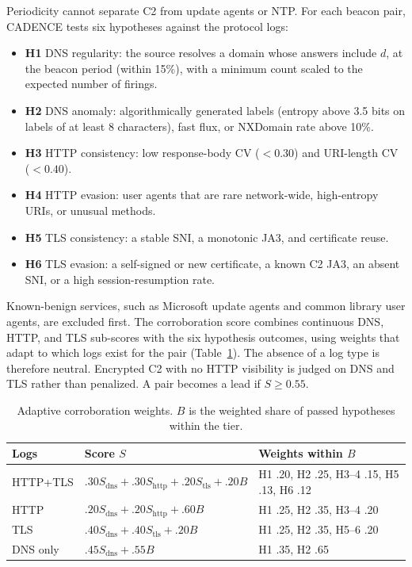 \documentclass[runningheads]{llncs}
\begin{document}
Periodicity cannot separate C2 from update agents or NTP. For each beacon pair, CADENCE tests six hypotheses against the protocol logs:
\begin{itemize}
\item \textbf{H1} DNS regularity: the source resolves a domain whose answers include $d$, at the beacon period (within 15\%), with a minimum count scaled to the expected number of firings.
\item \textbf{H2} DNS anomaly: algorithmically generated labels (entropy above 3.5 bits on labels of at least 8 characters), fast flux, or NXDomain rate above 10\%.
\item \textbf{H3} HTTP consistency: low response-body CV ($<0.30$) and URI-length CV ($<0.40$).
\item \textbf{H4} HTTP evasion: user agents that are rare network-wide, high-entropy URIs, or unusual methods.
\item \textbf{H5} TLS consistency: a stable SNI, a monotonic JA3, and certificate reuse.
\item \textbf{H6} TLS evasion: a self-signed or new certificate, a known C2 JA3, an absent SNI, or a high session-resumption rate.
\end{itemize}
Known-benign services, such as Microsoft update agents and common library user agents, are excluded first. The corroboration score combines continuous DNS, HTTP, and TLS sub-scores with the six hypothesis outcomes, using weights that adapt to which logs exist for the pair (Table~\ref{tab:weights}). The absence of a log type is therefore neutral. Encrypted C2 with no HTTP visibility is judged on DNS and TLS rather than penalized. A pair becomes a lead if $S \ge 0.55$.

\begin{table}[tbp]
\centering\scriptsize
\caption{Adaptive corroboration weights. $B$ is the weighted share of passed hypotheses within the tier.}\label{tab:weights}
\setlength{\tabcolsep}{3pt}
\begin{tabular}{@{}lll@{}}
\toprule
Logs & Score $S$ & Weights within $B$\\
\midrule
HTTP+TLS & $.30S_{\text{dns}}+.30S_{\text{http}}+.20S_{\text{tls}}+.20B$ & H1 .20, H2 .25, H3--4 .15, H5 .13, H6 .12\\
HTTP & $.20S_{\text{dns}}+.20S_{\text{http}}+.60B$ & H1 .25, H2 .35, H3--4 .20\\
TLS & $.40S_{\text{dns}}+.40S_{\text{tls}}+.20B$ & H1 .25, H2 .35, H5--6 .20\\
DNS only & $.45S_{\text{dns}}+.55B$ & H1 .35, H2 .65\\
\bottomrule
\end{tabular}
\end{table}
\end{document}
